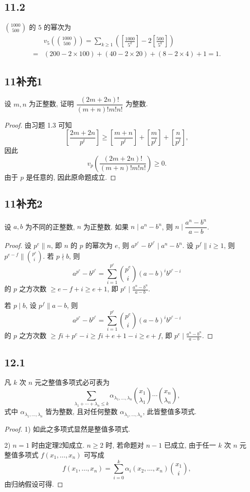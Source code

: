 \documentclass[12pt,a4paper,reqno]{amsart}
\theoremstyle{remark}
\renewcommand{\le}{\leqslant}
\renewcommand{\ge}{\geqslant}
\begin{document}
\subsection*{11.2}
${1000\choose 500}$ 的 $5$ 的幂次为
  \[\begin{split}
    &v_5({1000\choose 500})
   =\sum_{k\ge 1}(\left[\frac{1000}{5^k}\right]-2\left[\frac{500}{5^k}\right])\\
   =&(200-2\times 100)+(40-2\times 20)+(8-2\times 4)+1=1.
  \end{split}\]

\subsection*{11补充1}
设 $m,n$ 为正整数, 证明 $\dfrac{(2m+2n)!}{(m+n)!m!n!}$ 为整数.
\begin{proof}
由习题 1.3 可知
  \[[\frac{2m+2n}{p^t}]\geqslant [\frac{m+n}{p^t}]+[\frac{m}{p^t}]+[\frac{n}{p^t}],\]
因此
  \[v_p\left(\dfrac{(2m+2n)!}{(m+n)!m!n!}\right)\ge 0.\]
由于 $p$ 是任意的, 因此原命题成立.
\end{proof}

\subsection*{11补充2}
设 $a,b$ 为不同的正整数, $n$ 为正整数. 如果 $n\mid a^n-b^n$, 则 $n\mid \dfrac{a^n-b^n}{a-b}$.
\begin{proof}
设 $p^e\|n$, 即 $n$ 的 $p$ 的幂次为 $e$, 则 $a^{p^e}-b^{p^e}\mid a^n-b^n$. 设 $p^f\| i\geqslant 1$, 则 $p^{e-f}\|{p^e\choose i}$. 若 $p\nmid b$, 则
  \[a^{p^e}-b^{p^e}=\sum_{i=1}^{p^e} {p^e\choose i}(a-b)^i b^{p^e-i}\]
的 $p$ 之方次数 $\geqslant e-f+i\geqslant e+1$, 即 $p^e\mid \frac{a^n-b^n}{a-b}$.

若 $p\mid b$, 设 $p^f\| a-b$, 则
  \[a^{p^e}-b^{p^e}=\sum_{i=1}^{p^e}{p^e\choose i}(a-b)^i b^{p^e-i}\]
的 $p$ 之方次数 $\geqslant fi+p^e-i\geqslant fi+e+1-i\geqslant e+f$,  即 $p^e\mid \frac{a^n-b^n}{a-b}$.
\end{proof}

\subsection*{12.1}
凡 $k$ 次 $n$ 元之整值多项式必可表为
  \[\sum_{\lambda_1+\cdots+\lambda_n\le k} \alpha_{\lambda_1,\ldots,\lambda_n}{x_1\choose \lambda_1}\cdots {x_n\choose \lambda_n},\]
式中 $\alpha_{\lambda_1,\ldots,\lambda_n}$ 皆为整数, 且对任何整数 $\alpha_{\lambda_1,\ldots,\lambda_n}$, 此皆整值多项式.
\begin{proof}
1) 如此之多项式显然是整值多项式.

2) $n=1$ 时由定理2知成立. $n\geqslant 2$ 时, 若命题对 $n-1$ 已成立, 由于任一 $k$ 次 $n$ 元整值多项式 $f(x_1,\ldots,x_n)$ 可写成
  \[ f(x_1,\ldots,x_n)=\sum_{i=0}^k \alpha_i(x_2,\ldots,x_n){x_1\choose i}, \]
由归纳假设可得.
\end{proof}
\end{document}

